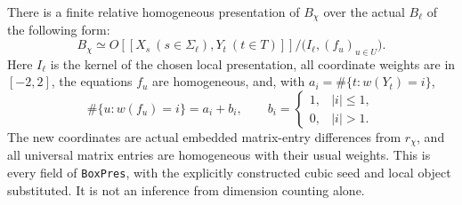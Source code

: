 \begin{theorem}
\label{AC-G50}
There is a finite relative homogeneous presentation of
$B_\chi$ over the actual $B_\ell$ of the following form:
\[
 B_\chi\simeq
 O[[X_s\ (s\in\Sigma_\ell),Y_t\ (t\in T)]]
 \big/\bigl(I_\ell,(f_u)_{u\in U}\bigr).                    \tag{G50.1}
\]
Here $I_\ell$ is the kernel of the chosen local presentation,
all coordinate weights are in $[-2,2]$, the equations $f_u$
are homogeneous, and, with
$a_i=\#\{t:w(Y_t)=i\}$,
\[
 \#\{u:w(f_u)=i\}=a_i+b_i,
 \qquad b_i=\begin{cases}1,&|i|\le1,\\0,&|i|>1.
                       \end{cases}                         \tag{G50.2}
\]
The new coordinates are actual embedded matrix-entry
differences from $r_\chi$, and all universal matrix entries
are homogeneous with their usual weights.
This is every field of \texttt{BoxPres}, with the explicitly
constructed cubic seed and local object substituted.
It is not an inference from dimension counting alone.
\end{theorem}
